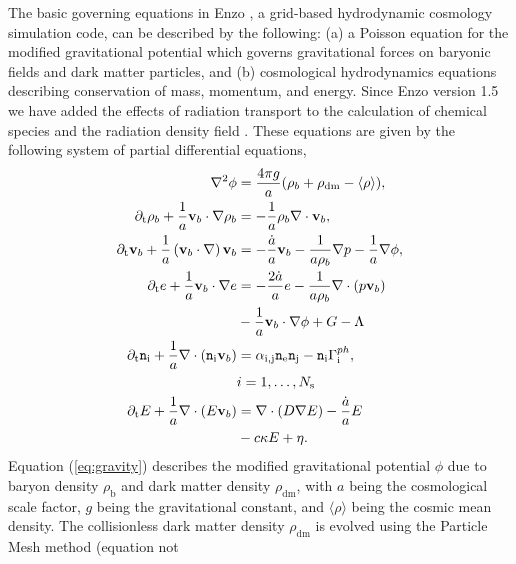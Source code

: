 \documentclass[letterpaper,10pt]{article}
\renewcommand{\(}{\left(}
\renewcommand{\)}{\right)}
\newcommand{\vb}{{\bf v}_b}
\newcommand{\rhob}{\rho_b}
\newcommand{\mn}{{\tt n}}
\begin{document}
The basic governing equations in Enzo \citep{OSheaEtAl2004,NormanEtAl2004},
a grid-based hydrodynamic
cosmology simulation code, can be described by the following:  (a)
a Poisson equation for the modified gravitational potential which
governs gravitational forces on baryonic fields and dark matter
particles, and (b) cosmological hydrodynamics equations describing
conservation of mass, momentum, and energy.  Since Enzo version 1.5
we have added the effects of radiation transport to the calculation of
chemical species and the radiation density field 
\citep{ReynoldsHayesPaschosNorman2009, HarknessNormanReynoldsSo2011_a}. 
These equations are given by the following system of partial
differential equations,
\begin{align}
  \label{eq:gravity}
  \nabla^2 \phi &= \frac{4\pi g}{a}(\rhob + \rho_\mathrm{dm} - \langle \rho \rangle), \\
  \label{eq:cons_mass}
  \partial_\mathrm{t} \rhob + \frac1a \vb \cdot \nabla
    \rhob &= -\frac1a \rhob \nabla\cdot\vb, \\
  \label{eq:cons_momentum}
  \partial_\mathrm{t} \vb + \frac1a\(\vb\cdot\nabla\)\vb &=
    -\frac{\dot{a}}{a}\vb - \frac{1}{a\rhob}\nabla p - \frac1a
    \nabla\phi, \\
  \label{eq:cons_energy}
  \partial_\mathrm{t} e + \frac1a\vb\cdot\nabla e &=
    - \frac{2\dot{a}}{a}e
    - \frac{1}{a\rhob}\nabla\cdot\left(p\vb\right) \nonumber\\
    &- \frac1a\vb\cdot\nabla\phi + G - \Lambda \\
  \label{eq:chemical_ionization}
  \partial_\mathrm{t} \mn_\mathrm{i} + \frac{1}{a}\nabla\cdot\(\mn_\mathrm{i}\vb\) &=
    \alpha_\mathrm{i,j} \mn_\mathrm{e} \mn_\mathrm{j} - \mn_\mathrm{i} \Gamma_\mathrm{i}^{ph}, \qquad \nonumber\\
    &i=1,\ldots,N_\mathrm{s} \\
  \label{eq:cons_radiation}
  \partial_\mathrm{t} E + \frac1a \nabla\cdot\(E \vb\) &= 
    \nabla\cdot\(D\nabla E\) - \frac{\dot{a}}{a}E \nonumber\\
    &- c \kappa E + \eta.
\end{align}
Equation (\ref{eq:gravity}) describes the modified gravitational
potential $\phi$ due to baryon density $\rho_\mathrm{b}$ and dark matter
density $\rho_\mathrm{dm}$, with $a$ being the cosmological scale factor, $g$
being the gravitational constant, and $\langle \rho \rangle$ being the
cosmic mean density.  The collisionless dark matter density
$\rho_\mathrm{dm}$ is evolved using the Particle Mesh method (equation not
\end{document}
